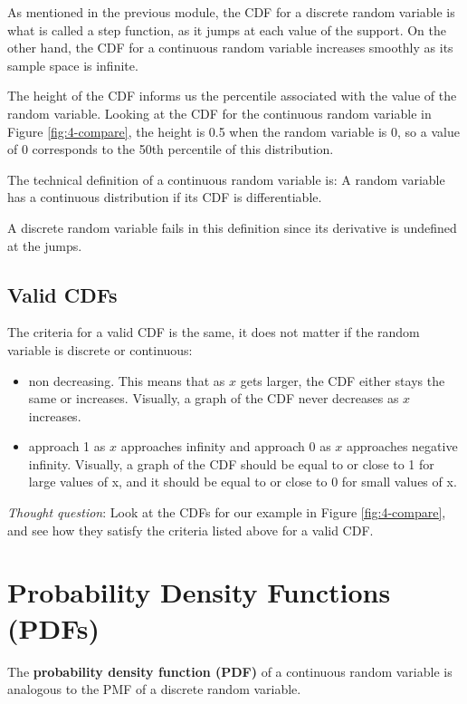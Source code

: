 \documentclass[
]{book}
\providecommand{\tightlist}{%
  \setlength{\itemsep}{0pt}\setlength{\parskip}{0pt}}
\begin{document}
As mentioned in the previous module, the CDF for a discrete random variable is what is called a step function, as it jumps at each value of the support. On the other hand, the CDF for a continuous random variable increases smoothly as its sample space is infinite.

The height of the CDF informs us the percentile associated with the value of the random variable. Looking at the CDF for the continuous random variable in Figure \ref{fig:4-compare}, the height is 0.5 when the random variable is 0, so a value of 0 corresponds to the 50th percentile of this distribution.

The technical definition of a continuous random variable is: A random variable has a continuous distribution if its CDF is differentiable.

A discrete random variable fails in this definition since its derivative is undefined at the jumps.

\hypertarget{valid-cdfs-1}{%
\subsection{Valid CDFs}\label{valid-cdfs-1}}

The criteria for a valid CDF is the same, it does not matter if the random variable is discrete or continuous:

\begin{itemize}
\tightlist
\item
  non decreasing. This means that as \(x\) gets larger, the CDF either stays the same or increases. Visually, a graph of the CDF never decreases as \(x\) increases.
\item
  approach 1 as \(x\) approaches infinity and approach 0 as \(x\) approaches negative infinity. Visually, a graph of the CDF should be equal to or close to 1 for large values of x, and it should be equal to or close to 0 for small values of x.
\end{itemize}

\emph{Thought question}: Look at the CDFs for our example in Figure \ref{fig:4-compare}, and see how they satisfy the criteria listed above for a valid CDF.

\hypertarget{PDFs}{%
\section{Probability Density Functions (PDFs)}\label{PDFs}}

The \textbf{probability density function (PDF)} of a continuous random variable is analogous to the PMF of a discrete random variable.
\end{document}
